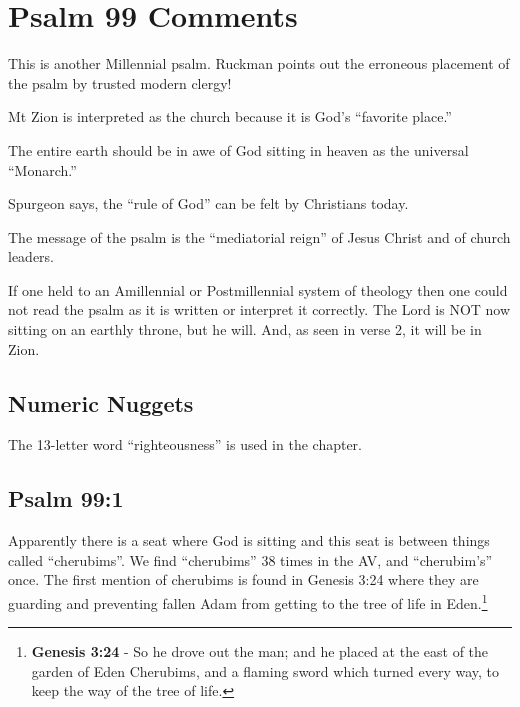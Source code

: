 \section{Psalm 99 Comments}
This is another Millennial psalm. Ruckman points out the erroneous placement of the psalm by trusted modern clergy!\cite{Ruckman1992Psalms}
\begin{compactenum}[I.]
	\item Mt Zion is interpreted as the church because it is God's ``favorite place.''
	\item The entire earth should be in awe of God sitting in heaven as the universal ``Monarch.''
	\item Spurgeon says, the ``rule of God'' can be felt by Christians today.\cite{spurgeon2016treasury}
	\item The message of the psalm is the ``mediatorial reign'' of Jesus Christ and of church leaders.
\end{compactenum}
If one held to an Amillennial or Postmillennial system of theology then one could not read the psalm as it is written  or interpret it correctly. The Lord is NOT now sitting on an earthly throne, but he will. And, as seen in verse 2, it will be in Zion.

\subsection{Numeric Nuggets}
The 13-letter word ``righteousness'' is used in the chapter.

\subsection{Psalm 99:1}
Apparently there is a seat where God is sitting and this seat is between things called ``cherubims''. We find ``cherubims'' 38 times in the AV, and ``cherubim's'' once. The first mention of cherubims is found in Genesis 3:24 where they are guarding and preventing fallen Adam from getting to the tree of life in Eden.\footnote{\textbf{Genesis 3:24} - So he drove out the man; and he placed at the east of the garden of Eden Cherubims, and a flaming sword which turned every way, to keep the way of the tree of life.}

